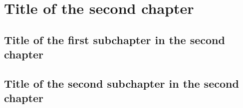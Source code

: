 \chapter{Title of the second chapter}

\section{Title of the first subchapter in the second chapter}

\section{Title of the second subchapter in the second chapter}

